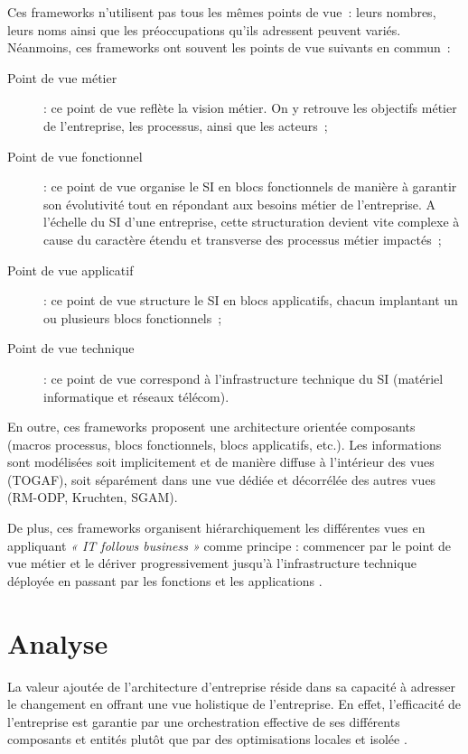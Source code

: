 Ces frameworks n'utilisent pas tous les mêmes points de vue~: leurs nombres, leurs noms 
ainsi que les préoccupations qu'ils adressent peuvent variés. Néanmoins, ces 
frameworks ont souvent les points de vue suivants en commun~:
\begin{description}
\item[Point de vue métier]  : ce point de vue reflète la vision métier. On y retrouve les objectifs métier de l'entreprise, les processus, ainsi que les acteurs~;
\item[Point de vue fonctionnel] : ce point de vue organise le SI en blocs fonctionnels de manière à garantir son évolutivité tout en répondant aux besoins métier de l'entreprise. A l'échelle du SI d'une entreprise, cette structuration devient vite complexe à cause du caractère étendu et transverse des processus métier impactés~;
\item[Point de vue applicatif] : ce point de vue structure le SI en blocs applicatifs, chacun implantant un ou plusieurs blocs fonctionnels~;
\item[Point de vue technique] : ce point de vue correspond à l'infrastructure technique du SI (matériel informatique et réseaux télécom).
\end{description}

En outre, ces frameworks proposent une architecture orientée composants (macros processus, blocs fonctionnels, blocs applicatifs, etc.). Les informations sont modélisées soit implicitement et de manière diffuse à l'intérieur des vues (TOGAF), soit séparément dans une vue dédiée et décorrélée des autres vues (RM-ODP, Kruchten, SGAM).

De plus, ces frameworks organisent hiérarchiquement les différentes vues en appliquant \emph{« IT follows business »} comme principe : commencer par le point de vue métier et le dériver progressivement jusqu'à l'infrastructure technique déployée en passant par les fonctions et les applications \cite{winter2006essential}.


\section{Analyse}

La valeur ajoutée de l'architecture d'entreprise réside dans sa capacité à adresser le changement en offrant une vue holistique de l'entreprise. En effet, l'efficacité de l'entreprise  est garantie par une orchestration effective de ses différents composants et entités plutôt que par des optimisations locales et isolée \cite{nadler1992organizational}. 

